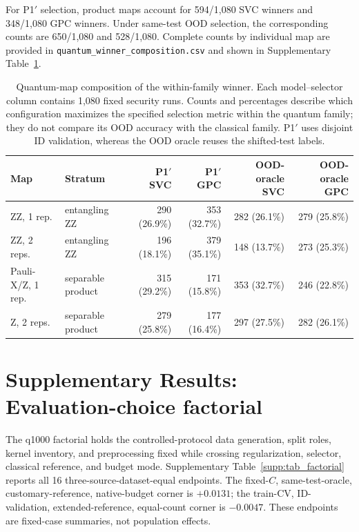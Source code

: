\documentclass[11pt]{article}
\begin{document}
For P1$'$ selection, product maps account for 594/1,080 SVC winners and
348/1,080 GPC winners. Under same-test OOD selection, the corresponding
counts are 650/1,080 and 528/1,080. Complete counts by individual map are
provided in \texttt{quantum\_winner\_composition.csv} and shown in
Supplementary Table~\ref{supp:tab_quantum_winners}.

\begin{table}[htbp]
\centering
\caption{Quantum-map composition of the within-family winner. Each
model--selector column contains 1,080 fixed security runs. Counts and
percentages describe which configuration maximizes the specified selection
metric within the quantum family; they do not compare its OOD accuracy with
the classical family. P1$'$ uses disjoint ID validation, whereas the OOD
oracle reuses the shifted-test labels.}
\label{supp:tab_quantum_winners}
\scriptsize
\setlength{\tabcolsep}{3.2pt}
\begin{tabular}{llrrrr}
\toprule
Map & Stratum & P1$'$ SVC & P1$'$ GPC & OOD-oracle SVC & OOD-oracle GPC \\
\midrule
ZZ, 1 rep. & entangling ZZ & 290 (26.9\%) & 353 (32.7\%) & 282 (26.1\%) & 279 (25.8\%) \\
ZZ, 2 reps. & entangling ZZ & 196 (18.1\%) & 379 (35.1\%) & 148 (13.7\%) & 273 (25.3\%) \\
Pauli-X/Z, 1 rep. & separable product & 315 (29.2\%) & 171 (15.8\%) & 353 (32.7\%) & 246 (22.8\%) \\
Z, 2 reps. & separable product & 279 (25.8\%) & 177 (16.4\%) & 297 (27.5\%) & 282 (26.1\%) \\
\bottomrule
\end{tabular}
\end{table}

\section*{Supplementary Results: Evaluation-choice factorial}
\label{supp:factorial}

The q1000 factorial holds the controlled-protocol data generation, split roles, kernel
inventory, and preprocessing fixed while crossing regularization, selector,
classical reference, and budget mode. Supplementary Table~\ref{supp:tab_factorial} reports
all 16 three-source-dataset-equal endpoints. The fixed-$C$, same-test-oracle,
customary-reference, native-budget corner is $+0.0131$; the train-CV,
ID-validation, extended-reference, equal-count corner is $-0.0047$.
These endpoints are fixed-case summaries, not population effects.
\end{document}

